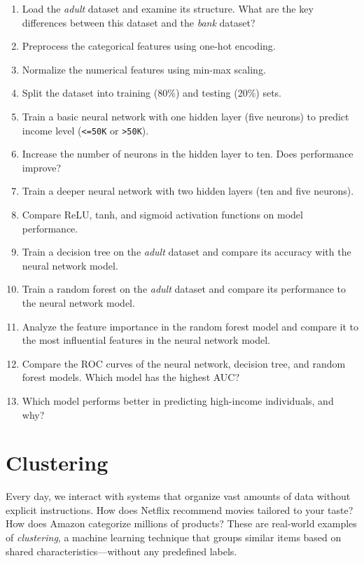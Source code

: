 \documentclass[
  11pt,
]{book}
\providecommand{\tightlist}{%
  \setlength{\itemsep}{0pt}\setlength{\parskip}{0pt}}
\theoremstyle{definition}
\theoremstyle{definition}
\theoremstyle{definition}
\theoremstyle{definition}
\theoremstyle{remark}
\begin{document}
\begin{enumerate}
\def\labelenumi{\arabic{enumi}.}
\setcounter{enumi}{28}
\tightlist
\item
  Load the \emph{adult} dataset and examine its structure. What are the key differences between this dataset and the \emph{bank} dataset?
\item
  Preprocess the categorical features using one-hot encoding.
\item
  Normalize the numerical features using min-max scaling.
\item
  Split the dataset into training (80\%) and testing (20\%) sets.
\item
  Train a basic neural network with one hidden layer (five neurons) to predict income level (\texttt{\textless{}=50K} or \texttt{\textgreater{}50K}).
\item
  Increase the number of neurons in the hidden layer to ten. Does performance improve?
\item
  Train a deeper neural network with two hidden layers (ten and five neurons).
\item
  Compare ReLU, tanh, and sigmoid activation functions on model performance.
\item
  Train a decision tree on the \emph{adult} dataset and compare its accuracy with the neural network model.
\item
  Train a random forest on the \emph{adult} dataset and compare its performance to the neural network model.
\item
  Analyze the feature importance in the random forest model and compare it to the most influential features in the neural network model.
\item
  Compare the ROC curves of the neural network, decision tree, and random forest models. Which model has the highest AUC?
\item
  Which model performs better in predicting high-income individuals, and why?
\end{enumerate}

\chapter{Clustering}\label{chapter-cluster}

Every day, we interact with systems that organize vast amounts of data without explicit instructions. How does Netflix recommend movies tailored to your taste? How does Amazon categorize millions of products? These are real-world examples of \emph{clustering}, a machine learning technique that groups similar items based on shared characteristics---without any predefined labels.
\end{document}
